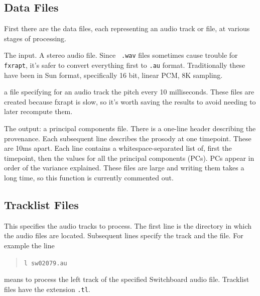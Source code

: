 \documentclass[11pt]{article}
\begin{document}
\subsection{Data Files}

First there are the data files, each representing an audio track or
file, at various stages of processing.

\begin{description}   \setlength{\itemsep}{0pt}\setlength{\parskip}{0pt}

\item [---.au, .wav] The input.  A stereo audio file.  Since {\tt
  .wav} files sometimes cause trouble for {\tt fxrapt}, it's safer to
  convert everything first to {\tt .au} format.  Traditionally these
  have been in Sun format, specifically 16 bit, linear PCM, 8K
  sampling.

\item[---f0.mat] a file specifying for an audio track the pitch every
  10 milliseconds.  These files are created because fxrapt is slow, so
  it's worth saving the results to avoid needing to later recompute
  them.

\item[---.pc] The output: a principal components file.  There is a
  one-line header describing the provenance.  Each subsequent line
  describes the prosody at one timepoint.  These are 10ms apart.  Each
  line contains a whitespace-separated list of, first the timepoint,
  then the values for all the principal components (PCs).  PCs appear
  in order of the variance explained.  These files are large and
  writing them takes a long time, so this function is currently
  commented out.
\end{description}


\subsection{Tracklist Files}       \label{tracklist-files}

This specifies the audio tracks to process.  The first line is the
directory in which the audio files are located.  Subsequent lines
specify the track and the file.  For example the line

\begin{quote}
\verb+l sw02079.au+
\end{quote}

means to process the left track of the specified Switchboard audio
file.  Tracklist files have the extension {\tt .tl}. 
\end{document}
